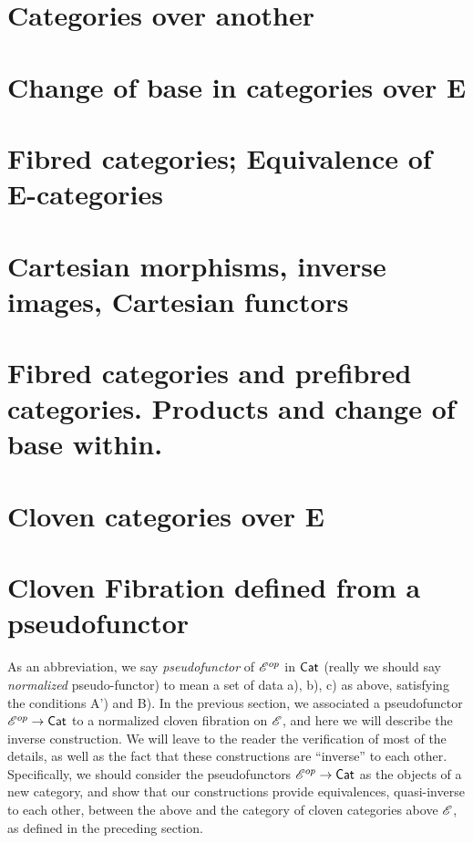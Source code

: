 \section{Categories over another}

\section{Change of base in categories over E}

\section{Fibred categories; Equivalence of E-categories}

\section{Cartesian morphisms, inverse images, Cartesian functors}

\section{Fibred categories and prefibred categories. Products and change of base within.}

\section{Cloven categories over E}

\section{Cloven Fibration defined from a pseudofunctor}

As an abbreviation, we say \emph{pseudofunctor} of $\mathscr{E}^{op}$ in $\mathsf{Cat}$ (really we should say \emph{normalized} pseudo-functor) to mean a set of data a), b), c) as above, satisfying the conditions A') and B).
In the previous section, we associated a pseudofunctor $\mathscr{E}^{op}\to\mathsf{Cat}$ to a normalized cloven fibration on $\mathscr{E}$, and here we will describe the inverse construction.
We will leave to the reader the verification of most of the details, as well as the fact that these constructions are ``inverse'' to each other. 
Specifically, we should consider the pseudofunctors $\mathscr{E}^{op} \to \mathsf{Cat}$ as the objects of a new category, and show that our constructions provide equivalences, quasi-inverse to each other, between the above and the category of cloven categories above $\mathscr{E}$, as defined in the preceding section.

